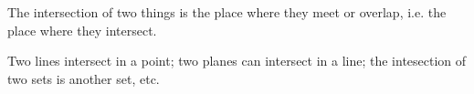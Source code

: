 The intersection of two things is the place where they meet or overlap,
i.e. the place where they intersect.
\par
Two lines intersect in a point; two planes can intersect in
a line; the intesection of two sets is another set, etc.